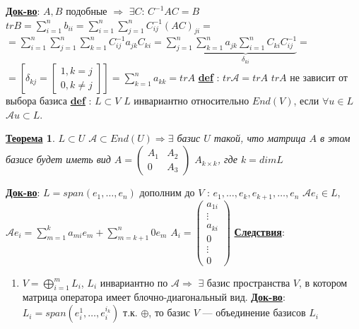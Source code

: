 \documentclass[12pt,a4paper]{article}
\newcommand{\bfline}[1]{\textbf{\underline{#1}}}
\newcommand{\Def}{\bfline{def} }
\newtheorem*{theorem*}{\bfline{Теорема}}
\begin{document}
\bfline{Док-во}: $A, B$ подобные $\Rightarrow$ \newline
$\exists C$: $C^{-1} A C = B$ \newline
$tr B = \sum\limits_{i=1}^{n} b_{i i} = \sum\limits_{i=1}^{n} \sum\limits_{j=1}^{n} C^{-1}_{ij} {(AC)}_{ji}=$ \newline
$=\sum\limits_{i=1}^{n} \sum\limits_{j=1}^{n} \sum\limits_{k=1}^{n} C^{-1}_{ij} a_{jk} C_{ki} = \sum\limits_{j=1}^{n} \underset{\delta_{ki}}{\underbrace{\sum\limits_{k=1}^{n} a_{jk} \sum\limits_{i=1}^{n} C_{ki} C^{-1}_{ij}}}=$ \newline
$=\left[ \delta_{kj}=
	\left[
	\begin{matrix}
		1, k=j \\
		0, k \neq j
	\end{matrix}\right]\right]=
\sum\limits_{k=1}^{n} a_{kk} = trA$ \newline
\Def : $tr \mathcal{A} = tr A$ \newline
$tr A$ не зависит от выбора базиса \newline
\Def : $L \subset V$ $L$ инвариантно относительно $End(V)$, если $\forall u \in L$ $\mathcal{A} u \subset L$. \newline
\begin{theorem*}
$L \subset U$ $\mathcal{A} \subset End(U) \Rightarrow \exists$ базис $U$ такой, что матрица $A$ в этом базисе будет иметь вид \newline
$A=
	\left(
	\begin{matrix}
	A_1 & A_2 \\
	0 & A_3
	\end{matrix}
	\right)$ \newline
$A_{k\times k}$, где $k = dim L$
\end{theorem*}
\bfline{Док-во}: $L = span(e_1, \ldots, e_n)$ дополним до $V$ : $e_1, \ldots, e_k, e_{k+1}, \ldots, e_n$ \newline
$\mathcal{A} e_i \in L$, $\mathcal{A} e_i = \sum\limits_{m=1}^{k} a_{mi} e_m + \sum\limits_{m=k+1}^{n} 0 e_m$ \newline
$A_i = 
	\left(
	\begin{matrix}
	a_{1 i} \\
	\vdots \\
	a_{k i} \\
	0 \\
	\vdots\\
	0
	\end{matrix}
	\right)$ \newline
\bfline{Следствия}:
\begin{enumerate}
	\item $V = \bigoplus\limits_{i=1}^{m} L_i$, $L_i$ инвариантно по $\mathcal{A} \Rightarrow$ \newline
		$\exists$ базис пространства $V$, в котором матрица оператора имеет блочно-диагональный вид. \newline
		\bfline{Док-во}:  $L_i = span(e^1_i, \ldots, e^{i_k}_i)$ \newline
		т.к. $\oplus$, то базис $V$ --- объединение базисов $L_i$
\end{enumerate}
\end{document}
